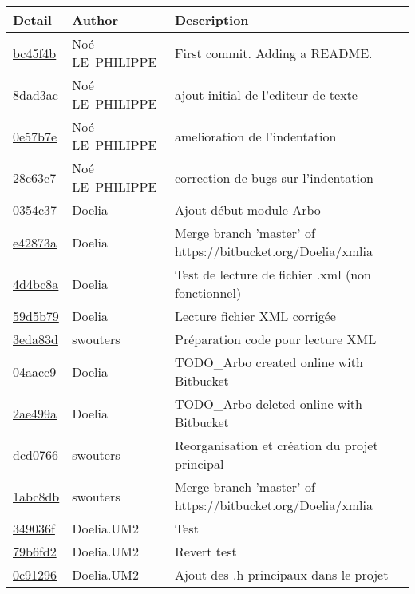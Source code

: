\begin{tabular}{l l l}\textbf{Detail} & \textbf{Author} & \textbf{Description}\\\hline
\href{bc45f4bf65a9699b23b7855b9fe6fe862dbf3cb1}{bc45f4b} & Noé LE PHILIPPE & First commit. Adding a README.\\\hline
\href{8dad3acf2d8942a5e92a461bb7f6edadc47bbc5f}{8dad3ac} & Noé LE PHILIPPE & ajout initial de l'editeur de texte\\\hline
\href{0e57b7ee92c65033e39411ed52653d1e39149070}{0e57b7e} & Noé LE PHILIPPE & amelioration de l'indentation\\\hline
\href{28c63c77379637b7d8c3cd8db039fe792151eb76}{28c63c7} & Noé LE PHILIPPE & correction de bugs sur l'indentation\\\hline
\href{0354c37a54e5a53599882b9b2af9366669c7fb18}{0354c37} & Doelia & Ajout début module Arbo\\\hline
\href{e42873ac8178bb68180061168186168150fe6866}{e42873a} & Doelia & Merge branch 'master' of https://bitbucket.org/Doelia/xmlia\\\hline
\href{4d4bc8aab1e2ef2f02283cffb6706bf6dfb1d90c}{4d4bc8a} & Doelia & Test de lecture de fichier .xml (non fonctionnel)\\\hline
\href{59d5b794dbe59fd4f35fb25b25873ab777c69e4e}{59d5b79} & Doelia & Lecture fichier XML corrigée\\\hline
\href{3eda83de6b1188f1bce2a0bca77f59ca0672dd00}{3eda83d} & swouters & Préparation code pour lecture XML\\\hline
\href{04aacc9c816fe0bdce938345f2c0cca8e877bec6}{04aacc9} & Doelia & TODO_Arbo created online with Bitbucket\\\hline
\href{2ae499af9467d5a60e8def2a67b76a96d0932a5e}{2ae499a} & Doelia & TODO_Arbo deleted online with Bitbucket\\\hline
\href{dcd076616b557e2218eb5ae9a924cc0cb6cbd04e}{dcd0766} & swouters & Reorganisation et création du projet principal\\\hline
\href{1abc8dbe329335c54fcdf05d3f5927bf51b058b3}{1abc8db} & swouters & Merge branch 'master' of https://bitbucket.org/Doelia/xmlia\\\hline
\href{349036fd7556d4ef122b131e73cd055072ae55ca}{349036f} & Doelia.UM2 & Test\\\hline
\href{79b6fd2811f20a64a14922bbb79cc7c64ffea71f}{79b6fd2} & Doelia.UM2 & Revert test\\\hline
\href{0c912961c263496a746319d96d18d5c539075ed6}{0c91296} & Doelia.UM2 & Ajout des .h principaux dans le projet\\\hline

\end{tabular}

